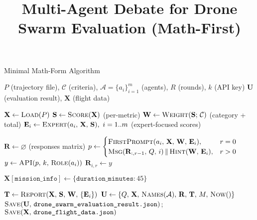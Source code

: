 \documentclass{article}
\begin{document}
\title{Multi-Agent Debate for Drone Swarm Evaluation (Math-First)}
\author{}
\date{}
\maketitle

\begin{algorithm}
\caption{Minimal Math-Form Algorithm}
\label{alg:math-first}
\begin{algorithmic}[1]
  \Require $P$ (trajectory file), $\mathcal{C}$ (criteria), $\mathcal{A}=\{a_i\}_{i=1}^m$ (agents), $R$ (rounds), $k$ (API key)
  \Ensure $\mathbf{U}$ (evaluation result), $\mathbf{X}$ (flight data)

  \State $\mathbf{X} \gets \textproc{Load}(P)$
  \State $\mathbf{S} \gets \textproc{Score}(\mathbf{X})$ \quad (per-metric)
  \State $\mathbf{W} \gets \textproc{Weight}(\mathbf{S};\,\mathcal{C})$ \quad (category + total)
  \State $\mathbf{E}_i \gets \textproc{Expert}(a_i,\,\mathbf{X},\,\mathbf{S}),\ i=1..m$ \quad (expert-focused scores)

  \State $\mathbf{R} \gets \varnothing$ \quad (responses matrix)
      \State $p \gets \begin{cases}
        \textproc{FirstPrompt}(a_i,\,\mathbf{X},\,\mathbf{W},\,\mathbf{E}_i), & r=0 \\
        \textproc{Msg}(\mathbf{R}_{:,r-1},\,Q,\,i)\,\Vert\,\textproc{Hint}(\mathbf{W},\,\mathbf{E}_i), & r>0
      \end{cases}$
      \State $y \gets \textproc{API}(p,\,k,\,\textproc{Role}(a_i))$
      \State $\mathbf{R}_{i,r} \gets y$
    \EndFor
  \EndFor

    \State $\mathbf{X}[\texttt{mission\_info}] \gets \{\texttt{duration\_minutes}:45\}$
  \EndIf

  \State $\mathbf{T} \gets \textproc{Report}(\mathbf{X},\,\mathbf{S},\,\mathbf{W},\,\{\mathbf{E}_i\})$
  \State $\mathbf{U} \gets \{Q,\,\mathbf{X},\,\textproc{Names}(\mathcal{A}),\,\mathbf{R},\,\mathbf{T},\,M,\,\textproc{Now}()\}$
  \State $\textproc{Save}(\mathbf{U},\,\texttt{drone\_swarm\_evaluation\_result.json})$;\quad $\textproc{Save}(\mathbf{X},\,\texttt{drone\_flight\_data.json})$
\end{algorithmic}
\end{algorithm}
\end{document}
